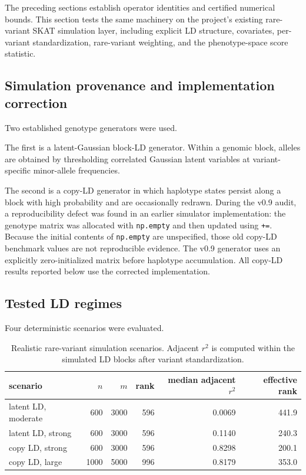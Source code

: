 \documentclass[11pt]{article}
\theoremstyle{definition}
\theoremstyle{remark}
\begin{document}
The preceding sections establish operator identities and certified numerical
bounds.  This section tests the same machinery on the project's existing
rare-variant SKAT simulation layer, including explicit LD structure,
covariates, per-variant standardization, rare-variant weighting, and the
phenotype-space score statistic.

\subsection{Simulation provenance and implementation correction}

Two established genotype generators were used.

The first is a latent-Gaussian block-LD generator.  Within a genomic block,
alleles are obtained by thresholding correlated Gaussian latent variables at
variant-specific minor-allele frequencies.

The second is a copy-LD generator in which haplotype states persist along a
block with high probability and are occasionally redrawn.  During the v0.9
audit, a reproducibility defect was found in an earlier simulator implementation: the genotype
matrix was allocated with \verb|np.empty| and then updated using \verb|+=|.
Because the initial contents of \verb|np.empty| are unspecified, those old
copy-LD benchmark values are not reproducible evidence.  The v0.9 generator
uses an explicitly zero-initialized matrix before haplotype accumulation.
All copy-LD results reported below use the corrected implementation.

\subsection{Tested LD regimes}

Four deterministic scenarios were evaluated.

\begin{table}[H]
\centering
\caption{Realistic rare-variant simulation scenarios.  Adjacent $r^2$ is
computed within the simulated LD blocks after variant standardization.}
\begin{tabular}{lrrrrr}
\toprule
scenario & $n$ & $m$ & rank & median adjacent $r^2$ & effective rank\\
\midrule
latent LD, moderate & 600 & 3000 & 596 & 0.0069 & 441.9\\
latent LD, strong & 600 & 3000 & 596 & 0.1140 & 240.3\\
copy LD, strong & 600 & 3000 & 596 & 0.8298 & 200.1\\
copy LD, large & 1000 & 5000 & 996 & 0.8179 & 353.0\\
\bottomrule
\end{tabular}
\end{table}
\end{document}
